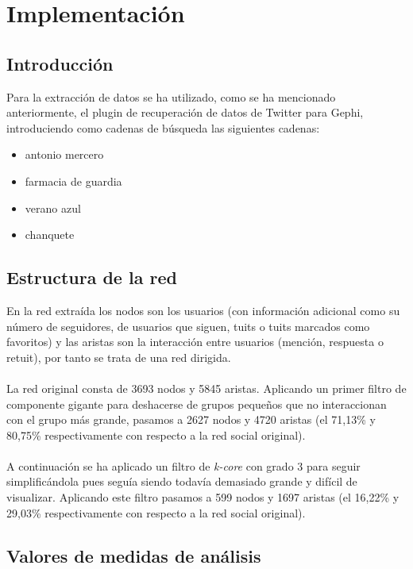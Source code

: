 \chapter{Implementación}

\section{Introducción}
\label{sec:intro}

Para la extracción de datos se ha utilizado, como se ha mencionado anteriormente, el plugin de recuperación de datos de Twitter para Gephi, introduciendo como cadenas de búsqueda las siguientes cadenas:

\begin{itemize}
	\item antonio mercero
	\item farmacia de guardia
	\item verano azul
	\item chanquete
\end{itemize}

\section{Estructura de la red}

En la red extraída los nodos son los usuarios (con información adicional como su número de seguidores, de usuarios que siguen, tuits o tuits marcados como favoritos) y las aristas son la interacción entre usuarios (mención, respuesta o retuit), por tanto se trata de una red dirigida.
\\ \\
La red original consta de 3693 nodos y 5845 aristas. Aplicando un primer filtro de componente gigante para deshacerse de grupos pequeños que no interaccionan con el grupo más grande, pasamos a 2627 nodos y 4720 aristas (el 71,13\% y 80,75\% respectivamente con respecto a la red social original).
\\ \\
A continuación se ha aplicado un filtro de \textit{k-core} con grado 3 para seguir simplificándola pues seguía siendo todavía demasiado grande y difícil de visualizar. Aplicando este filtro pasamos a 599 nodos y 1697 aristas (el 16,22\% y 29,03\% respectivamente con respecto a la red social original).

\section{Valores de medidas de análisis}
\label{sec:medidas}

